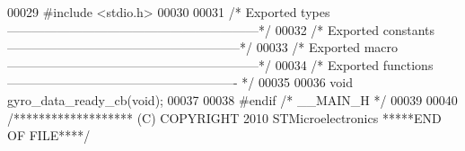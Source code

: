 \begin{DoxyCode}
00029 \textcolor{preprocessor}{#}\textcolor{preprocessor}{include} \textcolor{preprocessor}{<}\textcolor{preprocessor}{stdio}\textcolor{preprocessor}{.}\textcolor{preprocessor}{h}\textcolor{preprocessor}{>}
00030 
00031 \textcolor{comment}{/* Exported types ------------------------------------------------------------*/}
00032 \textcolor{comment}{/* Exported constants --------------------------------------------------------*/}
00033 \textcolor{comment}{/* Exported macro ------------------------------------------------------------*/}
00034 \textcolor{comment}{/* Exported functions ------------------------------------------------------- */}
00035 
00036 \textcolor{keywordtype}{void} gyro_data_ready_cb(\textcolor{keywordtype}{void});
00037 
00038 \textcolor{preprocessor}{#}\textcolor{preprocessor}{endif} \textcolor{comment}{/* \_\_MAIN\_H */}
00039 
00040 \textcolor{comment}{/******************* (C) COPYRIGHT 2010 STMicroelectronics *****END OF FILE****/}
\end{DoxyCode}
